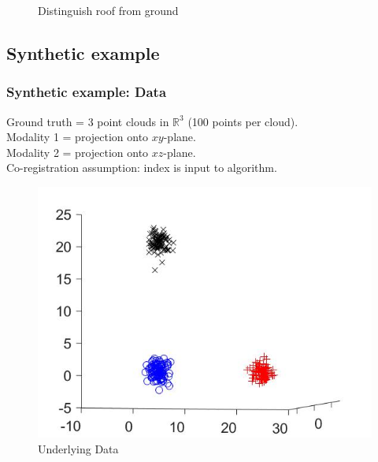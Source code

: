 \documentclass{beamer}
\begin{document}
\begin{frame}
\begin{figure}
\begin{minipage}[b]{0.40\linewidth}
      \caption{Distinguish roof from ground}
    \end{minipage}
    \hfill
  \end{figure}
\end{frame}


\subsection{Synthetic example}
\begin{frame}
  \frametitle{Synthetic example: Data}
  Ground truth = 3 point clouds in $\mathbb{R}^3$ (100 points per cloud).\\
  Modality 1 = projection onto $xy$-plane.\\
  Modality 2 = projection onto $xz$-plane.\\
  Co-registration assumption: index is input to algorithm.
  \begin{figure}[ht]
    \begin{minipage}[b]{0.30\linewidth}
      \centering
      \includegraphics[width=\textwidth]{./Images/Synthetic/groundTruth.jpg}
      \caption{Underlying Data}
    \end{minipage}
    \begin{minipage}[b]{0.30\linewidth}
      \centering

\end{minipage}
\end{figure}
\end{frame}
\end{document}
